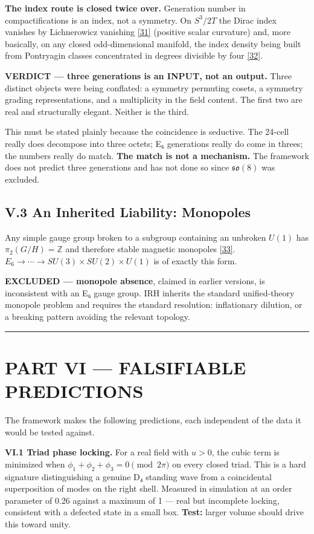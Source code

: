 \documentclass[a4paper,11pt]{article}
\begin{document}
\textbf{The index route is closed twice over.} Generation number in compactifications is an index, not a symmetry. On $S^3/2T$ the Dirac index vanishes by Lichnerowicz vanishing \hyperref[ref31]{[31]} (positive scalar curvature) and, more basically, on any closed odd-dimensional manifold, the index density being built from Pontryagin classes concentrated in degrees divisible by four \hyperref[ref32]{[32]}.

\textbf{VERDICT — three generations is an INPUT, not an output.} Three distinct objects were being conflated: a symmetry permuting cosets, a symmetry grading representations, and a multiplicity in the field content. The first two are real and structurally elegant. Neither is the third.

This must be stated plainly because the coincidence is seductive. The 24-cell really does decompose into three octets; E₆ generations really do come in threes; the numbers really do match. \textbf{The match is not a mechanism.} The framework does not predict three generations and has not done so since $\mathfrak{so}(8)$ was excluded.

\subsection*{V.3 An Inherited Liability: Monopoles}

Any simple gauge group broken to a subgroup containing an unbroken $U(1)$ has $\pi_2(G/H)=\mathbb{Z}$ and therefore stable magnetic monopoles \hyperref[ref33]{[33]}. $E_6\to\cdots\to SU(3)\times SU(2)\times U(1)$ is of exactly this form.

\textbf{EXCLUDED — monopole absence}, claimed in earlier versions, is inconsistent with an E₆ gauge group. IRH inherits the standard unified-theory monopole problem and requires the standard resolution: inflationary dilution, or a breaking pattern avoiding the relevant topology.

\medskip\hrule\medskip

\section*{PART VI — FALSIFIABLE PREDICTIONS}

The framework makes the following predictions, each independent of the data it would be tested against.

\textbf{VI.1 Triad phase locking.} For a real field with $u>0$, the cubic term is minimized when $\phi_1+\phi_2+\phi_3=0\pmod{2\pi}$ on every closed triad. This is a hard signature distinguishing a genuine D₄ standing wave from a coincidental superposition of modes on the right shell. Measured in simulation at an order parameter of 0.26 against a maximum of 1 — real but incomplete locking, consistent with a defected state in a small box. \textbf{Test:} larger volume should drive this toward unity.
\end{document}
